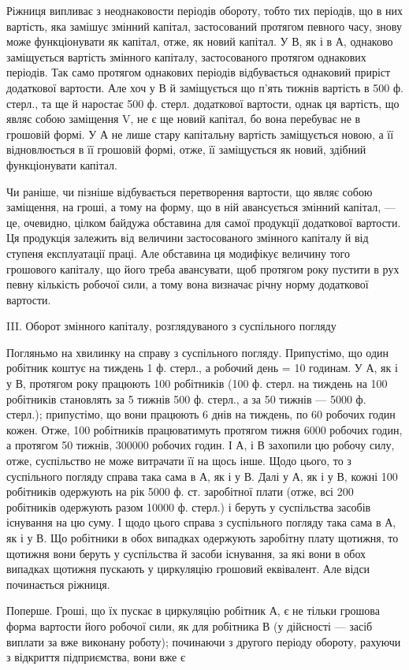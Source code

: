 Ріжниця випливає з неоднаковости періодів обороту, тобто тих періодів,
що в них вартість, яка замішує змінний капітал, застосований протягом
певного часу, знову може функціонувати як капітал, отже, як новий
капітал. У В, як і в А, однаково заміщується вартість змінного капіталу,
застосованого протягом однакових періодів. Так само протягом однакових
періодів відбувається однаковий приріст додаткової вартости. Але хоч у
В й заміщується що п’ять тижнів вартість в 500 ф. стерл., та ще й наростає
500 ф. стерл. додаткової вартости, однак ця вартість, що являє собою
заміщення V, не є ще новий капітал, бо вона перебуває не в грошовій
формі. У А не лише стару капітальну вартість заміщується новою, а її
відновлюється в її грошовій формі, отже, її заміщується як новий, здібний
функціонувати капітал.

Чи раніше, чи пізніше відбувається перетворення вартости, що являє
собою заміщення, на гроші, а тому на форму, що в ній авансується
змінний капітал, — це, очевидно, цілком байдужа обставина для самої
продукції додаткової вартости. Ця продукція залежить від величини застосованого
змінного капіталу й від ступеня експлуатації праці. Але обставина
ця модифікує величину того грошового капіталу, що його треба
авансувати, щоб протягом року пустити в рух певну кількість робочої
сили, а тому вона визначає річну норму додаткової вартости.

III. Оборот змінного капіталу, розглядуваного з суспільного погляду

Погляньмо на хвилинку на справу з суспільного погляду. Припустімо,
що один робітник коштує на тиждень 1 ф. стерл., а робочий день = 10 годинам.
У А, як і у В, протягом року працюють 100 робітників (100 ф.
стерл. на тиждень на 100 робітників становлять за 5 тижнів 500 ф. стерл., а
за 50 тижнів — 5000 ф. стерл.); припустімо, що вони працюють 6 днів на
тиждень, по 60 робочих годин кожен. Отже, 100 робітників працюватимуть
протягом тижня 6000 робочих годин, а протягом 50 тижнів, 300000 робочих
годин. І А, і В захопили цю робочу силу, отже, суспільство не може витрачати
її на щось інше. Щодо цього, то з суспільного погляду справа
така сама в А, як і у В. Далі у А, як і у В, кожні 100 робітників одержують
на рік 5000 ф. ст. заробітної плати (отже, всі 200 робітників
одержують разом 10000 ф. стерл.) і беруть у суспільства засобів існування
на цю суму. І щодо цього справа з суспільного погляду така сама в
А, як і у В. Що робітники в обох випадках одержують заробітну плату
щотижня, то щотижня вони беруть у суспільства й засоби існування, за
які вони в обох випадках щотижня пускають у циркуляцію грошовий
еквівалент. Але відси починається ріжниця.

Поперше. Гроші, що їх пускає в циркуляцію робітник А, є не
тільки грошова форма вартости його робочої сили, як для робітника В
(у дійсності — засіб виплати за вже виконану роботу); починаючи з другого
періоду обороту, рахуючи з відкриття підприємства, вони вже є
